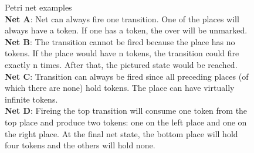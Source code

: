 \begin{figure}
  \caption{
    Petri net examples\\
    \textbf{Net A}: Net can always fire one transition. One of the places will always have a token. If one has a token, the over will be unmarked.\\
    \textbf{Net B}: The transition cannot be fired because the place has no tokens. If the place would have n tokens, the transition could fire exactly n times. After that, the pictured state would be reached.\\
    \textbf{Net C}: Transition can always be fired since all preceding places (of which there are none) hold tokens. The place can have virtually infinite tokens.\\
    \textbf{Net D}: Fireing the top transition will consume one token from the top place and produce two tokens: one on the left place and one on the right place. At the final net state, the bottom place will hold four tokens and the others will hold none.
    }
    \label{petrNetExamples}
\end{figure}